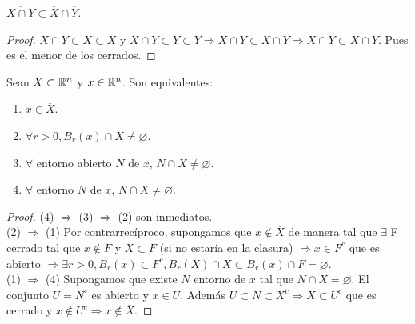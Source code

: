 \begin{prop}
  \(\overline{X \cap Y} \subset \overline{X} \cap \overline{Y} \).
  \begin{proof}
    \(X \cap Y \subset X \subset \overline{X} \) y \(X \cap Y \subset Y \subset \overline{Y} \Rightarrow X \cap Y \subset \overline{X} \cap \overline{Y} \Rightarrow \overline{X \cap Y} \subset \overline{X} \cap \overline{Y} \). Pues es el menor de los cerrados.
  \end{proof}
\end{prop}

\begin{prop}
  Sean \(X \subset \mathbb{R}^n\) y \(x \in \mathbb{R}^n\). Son equivalentes:
  \begin{enumerate}
    \item \(x \in \overline{X} \).
    \item \(\forall r > 0, B_r(x) \cap X \neq \varnothing \).
    \item \(\forall \) entorno abierto \(N\) de \(x\), \(N \cap X \neq \varnothing \).
    \item \(\forall \) entorno \(N\) de \(x\), \(N \cap X \neq \varnothing \).
  \end{enumerate}

  \begin{proof}
    (4) \(\Rightarrow \) (3) \(\Rightarrow \) (2) son inmediatos. \\
    (2) \(\Rightarrow \) (1) Por contrarrecíproco, supongamos que \(x \notin \overline{X} \) de manera tal que \(\exists \) F cerrado tal que \(x \notin F\) y \(X \subset F\) (si no estaría en la clasura) \(\Rightarrow x \in F^c\) que es abierto \(\Rightarrow \exists r > 0, B_r(x) \subset F^c, B_r(X) \cap X \subset B_r(x) \cap F = \varnothing \). \\
    (1) \(\Rightarrow \) (4) Supongamos que existe \(N\) entorno de \(x\) tal que \(N \cap X = \varnothing \). El conjunto \(U = N^{\circ} \) es abierto y \(x \in U\). Además \(U \subset N \subset X^c \Rightarrow X \subset U^c\) que es cerrado y \(x \notin U^c \Rightarrow x \notin \overline{X} \).
  \end{proof}
\end{prop}

